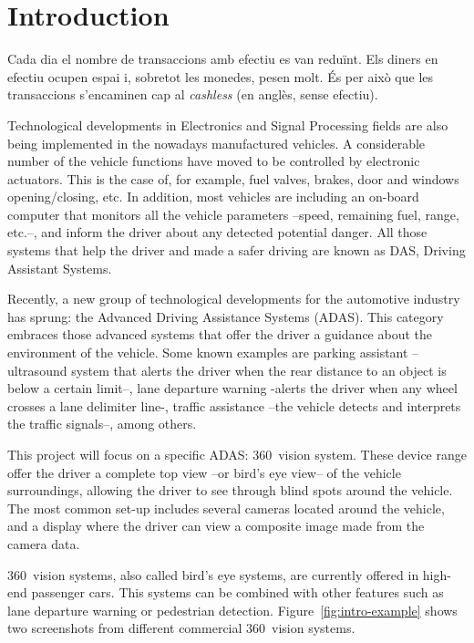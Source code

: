 \chapter{Introduction}

Cada dia el nombre de transaccions amb efectiu es van reduïnt. Els diners en efectiu ocupen espai i, sobretot les monedes, pesen molt. És per això que les transaccions s'encaminen cap al \textit{cashless} (en anglès, sense efectiu).



Technological developments in Electronics and Signal Processing fields are also being implemented in the nowadays manufactured vehicles. A considerable number of the vehicle functions have moved to be controlled by electronic actuators. This is the case of, for example, fuel valves, brakes, door and windows opening/closing, etc. In addition, most vehicles are including an on-board computer that monitors all the vehicle parameters --speed, remaining fuel, range, etc.--, and inform the driver about any detected potential danger. All those systems that help the driver and made a safer driving are known as DAS, Driving Assistant Systems.

Recently, a new group of technological   developments for the automotive industry has sprung: the Advanced Driving Assistance Systems (ADAS). This category embraces those advanced systems that offer the driver a guidance about the environment of the vehicle. Some known examples are parking assistant --ultrasound system that alerts the driver when the rear distance to an object is below a certain limit--, lane departure warning -alerts the driver when any wheel crosses a lane delimiter line-, traffic assistance --the vehicle detects and interprets the traffic signals--, among others.

This project will focus on a specific ADAS: 360\degree~vision system. These device range offer the driver a complete top view --or bird's eye view-- of the vehicle surroundings, allowing the driver to see through blind spots around the vehicle. The most common set-up  includes several cameras located around the vehicle, and a display where the driver can view a composite image made from the camera data.  

360\degree~vision systems, also called bird's eye systems, are currently offered in high-end passenger cars. This systems can be combined with other features such as lane departure warning or pedestrian detection. Figure~\ref{fig:intro-example} shows two screenshots from different commercial 360\degree~vision systems. 

